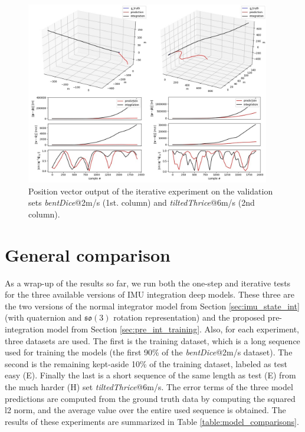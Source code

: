 \begin{figure}[h]
   \centering
   \includegraphics[width=0.95\textwidth]{thesis_template/img/iterative_experiment_pre_integration_pos.jpg}
   \caption{Position vector output of the iterative experiment on the validation sets \emph{bentDice}@2m/s (1st. column) and \emph{tiltedThrice}@6m/s (2nd column).}
   \label{fig:pre_integration_iterative_validation}
\end{figure}

\section{General comparison}

As a wrap-up of the results so far, we run both the one-step and iterative tests for the three available versions of IMU integration deep models.
These three are the two versions of the normal integrator model from Section \ref{sec:imu_state_int} (with quaternion and $\mathfrak{so}(3)$ rotation representation) and the proposed pre-integration model from Section \ref{sec:pre_int_training}.
Also, for each experiment, three datasets are used.
The first is the training dataset, which is a long sequence used for training the models (the first 90\% of the \emph{bentDice}@2m/s dataset). 
The second is the remaining kept-aside 10\% of the training dataset, labeled as test easy (E).
Finally the last is a short sequence of the same length as test (E) from the much harder (H) set \emph{tiltedThrice}@6m/s.
The error terms of the three model predictions are computed from the ground truth data by computing the squared l2 norm, and the average value over the entire used sequence is obtained. 
The results of these experiments are summarized in Table \ref{table:model_comparisons}.

